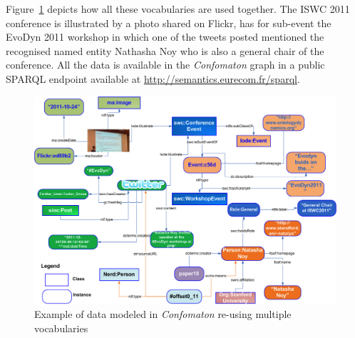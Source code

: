 Figure~\ref{fig:natasha-example} depicts how all these vocabularies are used together. The ISWC 2011 conference is illustrated by a photo shared on Flickr, has for sub-event the EvoDyn 2011 workshop in which one of the tweets posted mentioned the recognised named entity Nathasha Noy who is also a general chair of the conference. All the data is available in the \emph{Confomaton} graph in a public SPARQL endpoint available at \url{http://semantics.eurecom.fr/sparql}.
\begin{figure}[t!h]
 \centering
 \includegraphics[scale=0.3]{img/natasha_example.png}
 \caption{Example of data modeled in \emph{Confomaton} re-using multiple vocabularies}
 \label{fig:natasha-example}
\end{figure}



